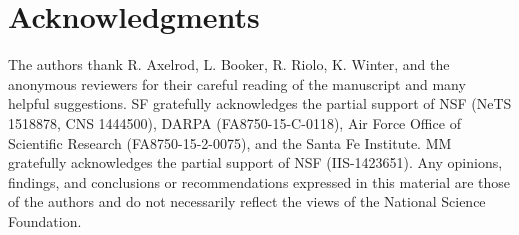 \documentclass{sig-alternate}
\begin{document}

\section{Acknowledgments}

The authors thank R. Axelrod, L. Booker, R. Riolo, K. Winter, and the
anonymous reviewers for their careful reading of the manuscript and
many helpful suggestions.  SF gratefully acknowledges the partial
support of NSF (NeTS 1518878, CNS 1444500), DARPA (FA8750-15-C-0118),
Air Force Office of Scientific Research (FA8750-15-2-0075), and the
Santa Fe Institute.  MM gratefully acknowledges the partial support of
NSF (IIS-1423651).  Any opinions, findings, and conclusions or
recommendations expressed in this material are those of the authors
and do not necessarily reflect the views of the National Science
Foundation.




\end{document}
